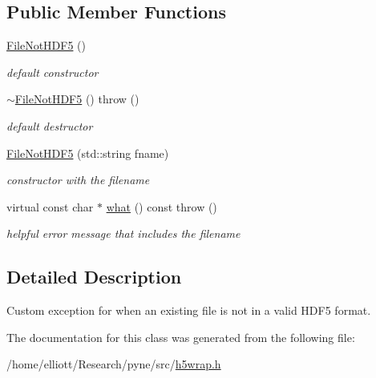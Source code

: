 \subsection*{Public Member Functions}
\begin{DoxyCompactItemize}
\item 
\hypertarget{classh5wrap_1_1_file_not_h_d_f5_a3fa40cb39abaa241e80ee97a13e69815}{\hyperlink{classh5wrap_1_1_file_not_h_d_f5_a3fa40cb39abaa241e80ee97a13e69815}{File\-Not\-H\-D\-F5} ()}\label{classh5wrap_1_1_file_not_h_d_f5_a3fa40cb39abaa241e80ee97a13e69815}

\begin{DoxyCompactList}\small\item\em default constructor \end{DoxyCompactList}\item 
\hypertarget{classh5wrap_1_1_file_not_h_d_f5_a55276b2bc97da82f25a0718327b00742}{\hyperlink{classh5wrap_1_1_file_not_h_d_f5_a55276b2bc97da82f25a0718327b00742}{$\sim$\-File\-Not\-H\-D\-F5} ()  throw ()}\label{classh5wrap_1_1_file_not_h_d_f5_a55276b2bc97da82f25a0718327b00742}

\begin{DoxyCompactList}\small\item\em default destructor \end{DoxyCompactList}\item 
\hypertarget{classh5wrap_1_1_file_not_h_d_f5_ac6f9e6588f3a55f26fe6cd13ab75425b}{\hyperlink{classh5wrap_1_1_file_not_h_d_f5_ac6f9e6588f3a55f26fe6cd13ab75425b}{File\-Not\-H\-D\-F5} (std\-::string fname)}\label{classh5wrap_1_1_file_not_h_d_f5_ac6f9e6588f3a55f26fe6cd13ab75425b}

\begin{DoxyCompactList}\small\item\em constructor with the filename \end{DoxyCompactList}\item 
\hypertarget{classh5wrap_1_1_file_not_h_d_f5_afce2273e3c8d54802598bdc30cdedec2}{virtual const char $\ast$ \hyperlink{classh5wrap_1_1_file_not_h_d_f5_afce2273e3c8d54802598bdc30cdedec2}{what} () const   throw ()}\label{classh5wrap_1_1_file_not_h_d_f5_afce2273e3c8d54802598bdc30cdedec2}

\begin{DoxyCompactList}\small\item\em helpful error message that includes the filename \end{DoxyCompactList}\end{DoxyCompactItemize}


\subsection{Detailed Description}
Custom exception for when an existing file is not in a valid H\-D\-F5 format. 

The documentation for this class was generated from the following file\-:\begin{DoxyCompactItemize}
\item 
/home/elliott/\-Research/pyne/src/\hyperlink{h5wrap_8h}{h5wrap.\-h}\end{DoxyCompactItemize}
